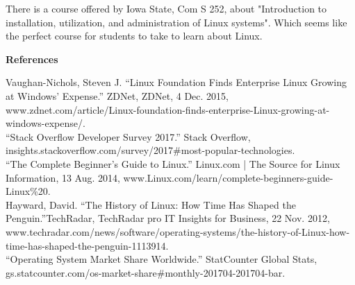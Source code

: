 \documentclass[11pt]{article}
\begin{document}
  There is a course offered by Iowa State, Com S 252, about "Introduction to installation, utilization, and administration of Linux systems". Which seems like the perfect course
  for students to take to learn about Linux. 

  \clearpage

  \begin{center} \large{\textbf{References}} \end{center}

  \noindent Vaughan-Nichols, Steven J. “Linux Foundation Finds Enterprise Linux Growing at Windows' Expense.” ZDNet, ZDNet, 4 Dec. 2015,\\ www.zdnet.com/article/Linux-foundation-finds-enterprise-Linux-growing-at-windows-expense/.\\

  \noindent “Stack Overflow Developer Survey 2017.” Stack Overflow,\\ insights.stackoverflow.com/survey/2017\#most-popular-technologies.\\

  \noindent “The Complete Beginner's Guide to Linux.” Linux.com | The Source for Linux Information, 13 Aug. 2014, www.Linux.com/learn/complete-beginners-guide-Linux\%20.\\

  \noindent Hayward, David. “The History of Linux: How Time Has Shaped the Penguin.”TechRadar, TechRadar pro IT Insights for Business, 22 Nov. 2012,\\ www.techradar.com/news/software/operating-systems/the-history-of-Linux-how-time-has-shaped-the-penguin-1113914.\\

  \noindent “Operating System Market Share Worldwide.” StatCounter Global Stats,\\ gs.statcounter.com/os-market-share\#monthly-201704-201704-bar.
\end{document}
